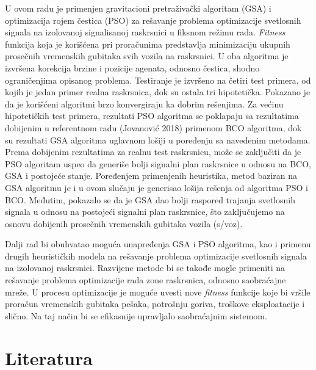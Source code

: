 U ovom radu je primenjen gravitacioni pretraživački algoritam (GSA) i optimizacija rojem čestica (PSO) za rešavanje problema optimizacije svetlosnih signala na izolovanoj signalisanoj raskrsnici u fiksnom režimu rada. \emph{Fitness} funkcija koja je korišćena pri proračunima predstavlja minimizaciju ukupnih prosečnih vremenskih gubitaka svih vozila na raskrsnici. U oba algoritma je izvršena korekcija brzine i pozicije agenata, odnosno čestica, shodno ograničenjima opisanog problema. Testiranje je izvršeno na četiri test primera, od kojih je jedan primer realna raskrsnica, dok su ostala tri hipotetička. Pokazano je da je korišćeni algoritmi brzo konvergiraju ka dobrim rešenjima. Za većinu hipotetičkih test primera, rezultati PSO algoritma se poklapaju sa rezultatima dobijenim u referentnom radu (Jovanović 2018) primenom BCO algoritma, dok su rezultati GSA algoritma uglavnom lošiji u poređenju sa navedenim metodama. Prema dobijenim rezultatima za realnu test raskrsnicu, može se zaključiti da je PSO algoritam uspeo da generiše bolji signalni plan raskrsnice u odnosu na BCO, GSA i postojeće stanje. Poređenjem primenjenih heuristika, metod baziran na GSA algoritmu je i u ovom slučaju je generisao lošija rešenja od algoritma PSO i BCO. Međutim, pokazalo se da je GSA dao bolji raspored trajanja svetlosnih signala u odnosu na postojeći signalni plan raskrsnice, što zaključujemo na osnovu dobijenih prosečnih vremenskih gubitaka vozila (s/voz).

Dalji rad bi obuhvatao moguća unapređenja GSA i PSO algoritma, kao i primenu drugih heurističkih modela na rešavanje problema optimizacije svetlosnih signala na izolovanoj raskrsnici. Razvijene metode bi se takođe mogle primeniti na rešavanje problema optimizacije rada zone raskrsnica, odnosno saobraćajne mreže. U procesu optimizacije je moguće uvesti nove \emph{fitness} funkcije koje bi vršile proračun vremenskih gubitaka pešaka, potrošnju goriva, troškove eksploatacije i slično. Na taj način bi se efikasnije upravljalo saobraćajnim sistemom. 

\section{Literatura}

